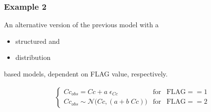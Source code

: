 \subsubsection*{Example 2}

An alternative version of the previous model with a 
\begin{itemize}
\item 
structured and 
\item 
distribution 
\end{itemize}
based models, dependent on FLAG value, respectively.

\begin{eqnarray}
&& \left\{ \begin{array}{lcl}  Cc_{obs} = Cc + a \;\epsilon_{Cc}  & \mbox{for} & \mbox{FLAG}  == 1	 \\
Cc_{obs} \sim \mathcal{N}\big(Cc, (a + b\;Cc)\big) & \mbox{for} & \mbox{FLAG} == 2 \nonumber
\end{array}\right.
\end{eqnarray}


